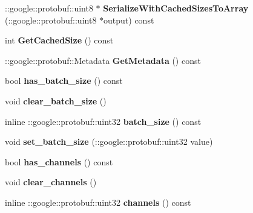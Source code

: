 \begin{DoxyCompactItemize}
\+::google\+::protobuf\+::uint8 $\ast$ {\bfseries Serialize\+With\+Cached\+Sizes\+To\+Array} (\+::google\+::protobuf\+::uint8 $\ast$output) const
\item 
\mbox{\label{classcaffe_1_1_memory_data_parameter_a9d5e0fd7527ab8574dfcc52fdcf8aaa1}} 
int {\bfseries Get\+Cached\+Size} () const
\item 
\mbox{\label{classcaffe_1_1_memory_data_parameter_ad6b621e499380128f25c66f842a58a3d}} 
\+::google\+::protobuf\+::\+Metadata {\bfseries Get\+Metadata} () const
\item 
\mbox{\label{classcaffe_1_1_memory_data_parameter_ad9d65460d2d852d6393e237a70268e79}} 
bool {\bfseries has\+\_\+batch\+\_\+size} () const
\item 
\mbox{\label{classcaffe_1_1_memory_data_parameter_aa5988fcf8bd10a16c6fb0c52cffb0a18}} 
void {\bfseries clear\+\_\+batch\+\_\+size} ()
\item 
\mbox{\label{classcaffe_1_1_memory_data_parameter_a6b3eae7db4cf4b0671168c9064518fd8}} 
inline \+::google\+::protobuf\+::uint32 {\bfseries batch\+\_\+size} () const
\item 
\mbox{\label{classcaffe_1_1_memory_data_parameter_a5f193d879b84a411a4a692f5fa9cf97a}} 
void {\bfseries set\+\_\+batch\+\_\+size} (\+::google\+::protobuf\+::uint32 value)
\item 
\mbox{\label{classcaffe_1_1_memory_data_parameter_ac5f3279699126df7b8f92db1174b1859}} 
bool {\bfseries has\+\_\+channels} () const
\item 
\mbox{\label{classcaffe_1_1_memory_data_parameter_aacde7b2756a178e0dcf7b45f22e60d56}} 
void {\bfseries clear\+\_\+channels} ()
\item 
\mbox{\label{classcaffe_1_1_memory_data_parameter_a2509031666f3870923224c0252cbfd74}} 
inline \+::google\+::protobuf\+::uint32 {\bfseries channels} () const

\end{DoxyCompactItemize}
